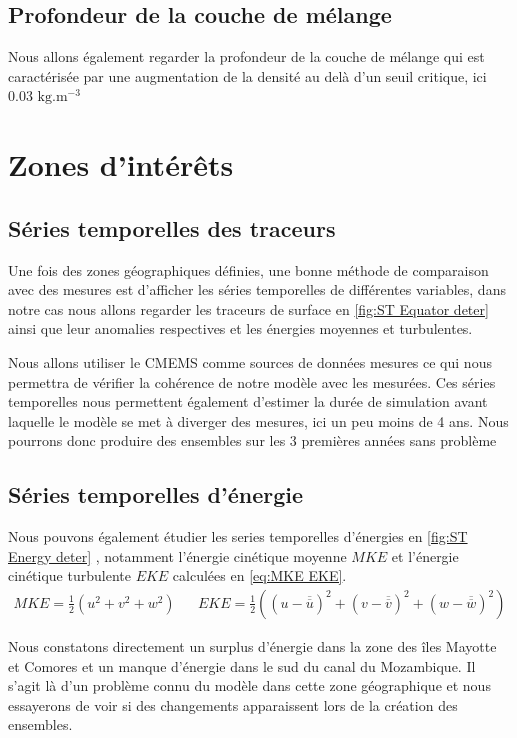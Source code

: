 \subsection{Profondeur de la couche de mélange}

Nous allons également regarder la profondeur de la couche de mélange qui est caractérisée par une augmentation de la densité au delà d'un seuil critique, ici 0.03 $\mathrm{kg.m^{-3}}$


\section{Zones d'intérêts}
\subsection{Séries temporelles des traceurs}

Une fois des zones géographiques définies, une bonne méthode de comparaison avec des mesures est d'afficher les séries temporelles de différentes variables, dans notre cas nous allons regarder les traceurs de surface en \autoref{fig:ST Equator deter} ainsi que leur anomalies respectives et les énergies moyennes et turbulentes. 

Nous allons utiliser le CMEMS comme sources de données mesures ce qui nous permettra de vérifier la cohérence de notre modèle avec les mesurées. Ces séries temporelles nous permettent également d'estimer la durée de simulation avant laquelle le modèle se met à diverger des mesures, ici un peu moins de 4 ans. Nous pourrons donc produire des ensembles sur les 3 premières années sans problème

\subsection{Séries temporelles d'énergie}

Nous pouvons également étudier les series temporelles d'énergies en \autoref{fig:ST Energy deter} , notamment l'énergie cinétique moyenne $MKE$ et l'énergie cinétique turbulente $EKE$ calculées en \autoref{eq:MKE EKE}.
\begin{align} \label{eq:MKE EKE}
	MKE = \frac{1}{2} \left(u^2 + v^2 + w^2 \right) && EKE = \frac{1}{2} \left(\left(u - \overline{\overline{u}} \right)^2 + \left(v - \overline{\overline{v}} \right)^2 + \left(w - \overline{\overline{w}} \right)^2 \right)
\end{align}

Nous constatons directement un surplus d'énergie dans la zone des îles Mayotte et Comores et un manque d'énergie dans le sud du canal du Mozambique. Il s'agit là d'un problème connu du modèle dans cette zone géographique et nous essayerons de voir si des changements apparaissent lors de la création des ensembles. 


